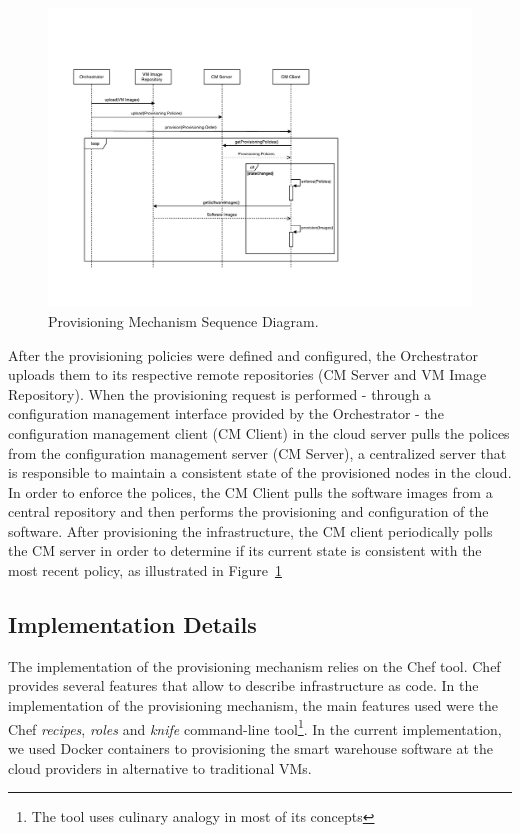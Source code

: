 \begin{figure}[ht!]
  \centering
  \includegraphics[width=\textwidth]{./images/provisioning_sequence}
  \caption[Provisioning Sequence Diagram]{Provisioning Mechanism Sequence Diagram.}
  \label{fig:provisioning_seq}
\end{figure}

After the provisioning policies were defined and configured, the Orchestrator uploads them to its respective
remote repositories (CM Server and VM Image Repository). When the provisioning request is performed -
through a configuration management interface provided by the Orchestrator - the configuration management
client (\gls{CM} Client) in the cloud server pulls the polices from the configuration management server
(\gls{CM} Server), a centralized server that is responsible to maintain a consistent state of the
provisioned nodes in the cloud. In order to enforce the polices, the \gls{CM} Client pulls the software
images from a central repository and then performs the provisioning and configuration of the software.
After provisioning the infrastructure, the CM client periodically polls the CM server in order to
determine if its current state is consistent with the most recent policy, as illustrated in Figure~\ref{fig:provisioning_seq}

\pagebreak

\subsection{Implementation Details}
\label{sub:Implementation Details}
The implementation of the provisioning mechanism relies on the Chef tool. Chef provides several features
that allow to describe infrastructure as code. In the implementation of the provisioning mechanism,
the main features used were the Chef \textit{recipes}, \textit{roles} and \textit{knife} command-line
tool\footnote{The tool uses culinary analogy in most of its concepts}. In the current implementation,
we used Docker containers to provisioning the smart warehouse software at the cloud providers in
alternative to traditional \glspl{VM}.

